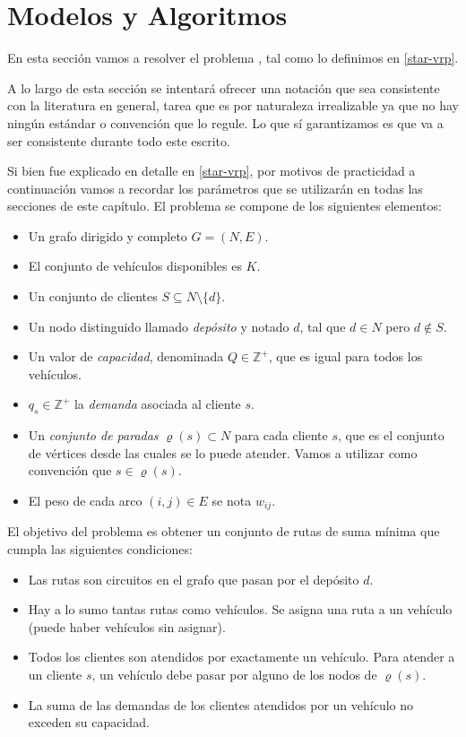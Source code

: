 \chapter{Modelos y Algoritmos}
\label{chapter:algoritmos}

En esta sección vamos a resolver el problema , tal como lo definimos en \ref{star-vrp}.

A lo largo de esta sección se intentará ofrecer una notación que sea consistente con la literatura en general, tarea que es por naturaleza irrealizable ya que no hay ningún estándar o convención que lo regule. Lo que sí garantizamos es que va a ser consistente durante todo este escrito.

Si bien fue explicado en detalle en \ref{star-vrp}, por motivos de practicidad a continuación vamos a recordar los parámetros que se utilizarán en todas las secciones de este capítulo. El problema se compone de los siguientes elementos:

\begin{itemize}
    \item Un grafo dirigido y completo $G = (N, E)$.
    \item El conjunto de vehículos disponibles es $K$.
    \item Un conjunto de clientes $S \subseteq N \setminus \{d\}$.
    \item Un nodo distinguido llamado \emph{depósito} y notado $d$, tal que $d \in N$ pero $d \notin S$.
    \item Un valor de \emph{capacidad}, denominada $Q \in \mathbb{Z}^{+}$, que es igual para todos los vehículos.
    \item  $q_s \in \mathbb{Z}^{+}$ la \emph{demanda} asociada al cliente $s$.
    \item Un \emph{conjunto de paradas} $\varrho(s) \subset N$ para cada cliente $s$, que es el conjunto de vértices desde las cuales se lo puede atender. Vamos a utilizar como convención que $s \in \varrho(s)$.
    \item El peso de cada arco $(i, j) \in E$ se nota $w_{ij}$.
\end{itemize}

El objetivo del problema es obtener un conjunto de rutas de suma mínima que cumpla las siguientes condiciones:

\begin{itemize}
\label{list:restrictions}
    \item Las rutas son circuitos en el grafo que pasan por el depósito $d$.
    \item Hay a lo sumo tantas rutas como vehículos. Se asigna una ruta a un vehículo (puede haber vehículos sin asignar).
    \item Todos los clientes son atendidos por exactamente un vehículo. Para atender a un cliente $s$, un vehículo debe pasar por alguno de los nodos de $\varrho(s)$.
    \item La suma de las demandas de los clientes atendidos por un vehículo no exceden su capacidad.
\end{itemize}

